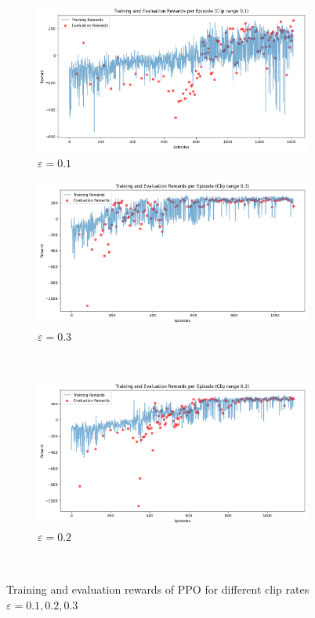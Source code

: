 \documentclass[a4paper, 11pt]{article}
\begin{document}
	\begin{figure}[H]
		\begin{center}
			\begin{subfigure}{0.48\textwidth}
				\includegraphics[width=\linewidth]{ppo_figures/cr_results_0.1.png}
				\caption{$\varepsilon=0.1$}
				\label{fig:ppo_cr01}
			\end{subfigure}\hfill 
			\begin{subfigure}{0.48\textwidth}
				\includegraphics[width=\linewidth]{ppo_figures/cr_results_0.3.png}
				\caption{$\varepsilon=0.3$}
				\label{fig:ppo_cr03}
			\end{subfigure}\\ 
			\begin{subfigure}{0.48\textwidth}
				\includegraphics[width=\linewidth]{ppo_figures/cr_results_0.2.png}
				\caption{$\varepsilon=0.2$}
				\label{fig:ppo_cr02}
			\end{subfigure}\
		\end{center}
		\caption{Training and evaluation rewards of PPO for different clip rates $\varepsilon=0.1,0.2,0.3$}
		\label{fig:ppo_cliprate}
	\end{figure}
	
\end{document}
